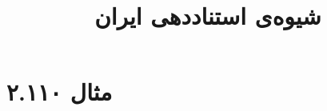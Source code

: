 \documentclass[a4paper,10pt]{article}
\begin{document}
\title{شیوه‌ی استناددهی ایران}
\author{}
\date{}
\maketitle



\section*{مثال ۲.۱۱۰}

\cite{عربی1373}\\
\cite{حسننایبی1377}\\
\\
\\






\end{document}

